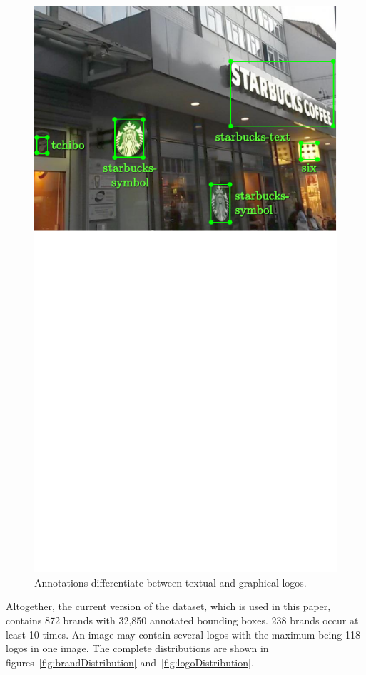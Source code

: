 \documentclass[a4paper,twoside]{article}
\begin{document}
\begin{figure}%
\centering%
\includegraphics[width=\linewidth, trim=0cm 9cm 0cm 0cm, clip]{img/annotatedSample.pdf}%
\caption{Annotations differentiate between textual and graphical logos.}%
\label{fig:annotatedSample}
\end{figure}%
%
Altogether, the current version of the dataset, which is used in this paper, contains 872 brands with 32,850 annotated bounding boxes. 238 brands occur at least 10 times. An image may contain several logos with the maximum being 118 logos in one image. The complete distributions are shown in figures~\ref{fig:brandDistribution} and~\ref{fig:logoDistribution}. 
\end{document}
